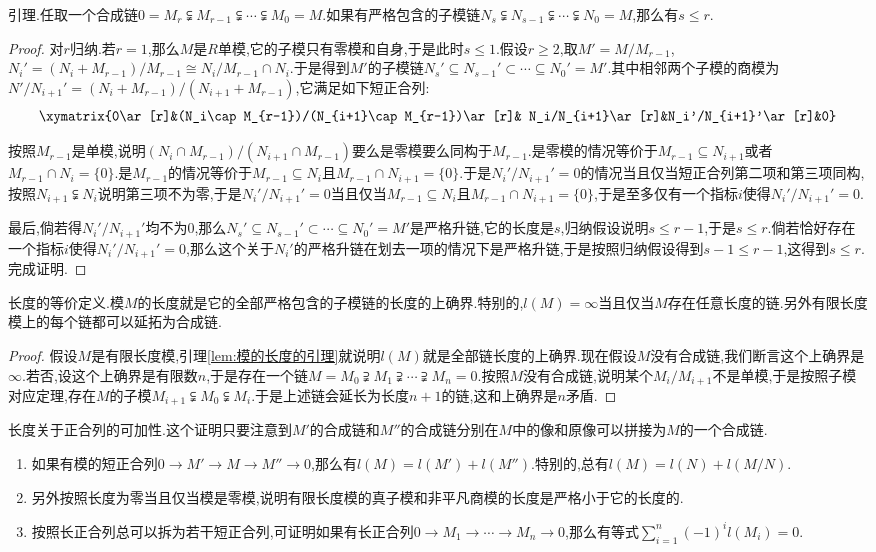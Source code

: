 引理.任取一个合成链$0=M_r\subsetneqq M_{r-1}\subsetneqq\cdots\subsetneqq M_0=M$.如果有严格包含的子模链$N_s\subsetneqq N_{s-1}\subsetneqq\cdots\subsetneqq N_0=M$,那么有$s\le r$.
\begin{proof}
	
	对$r$归纳.若$r=1$,那么$M$是$R$单模,它的子模只有零模和自身,于是此时$s\le1$.假设$r\ge2$,取$M'=M/M_{r-1}$,$N_i'=(N_i+M_{r-1})/M_{r-1}\cong N_i/M_{r-1}\cap N_i$.于是得到$M'$的子模链$N_s'\subseteq N_{s-1}'\subset\cdots\subseteq N_0'=M'$.其中相邻两个子模的商模为$N'/N_{i+1}'=(N_i+M_{r-1})/(N_{i+1}+M_{r-1})$,它满足如下短正合列:
	$$\xymatrix{0\ar[r]&(N_i\cap M_{r-1})/(N_{i+1}\cap M_{r-1})\ar[r]& N_i/N_{i+1}\ar[r]&N_i'/N_{i+1}'\ar[r]&0}$$
	
	按照$M_{r-1}$是单模,说明$(N_i\cap M_{r-1})/(N_{i+1}\cap M_{r-1})$要么是零模要么同构于$M_{r-1}$.是零模的情况等价于$M_{r-1}\subseteq N_{i+1}$或者$M_{r-1}\cap N_i=\{0\}$.是$M_{r-1}$的情况等价于$M_{r-1}\subseteq N_i$且$M_{r-1}\cap N_{i+1}=\{0\}$.于是$N_i'/N_{i+1}'=0$的情况当且仅当短正合列第二项和第三项同构,按照$N_{i+1}\subsetneqq N_i$说明第三项不为零,于是$N_i'/N_{i+1}'=0$当且仅当$M_{r-1}\subseteq N_i$且$M_{r-1}\cap N_{i+1}=\{0\}$,于是至多仅有一个指标$i$使得$N_i'/N_{i+1}'=0$.
	
	最后,倘若得$N_i'/N_{i+1}'$均不为0,那么$N_s'\subseteq N_{s-1}'\subset\cdots\subseteq N_0'=M'$是严格升链,它的长度是$s$,归纳假设说明$s\le r-1$,于是$s\le r$.倘若恰好存在一个指标$i$使得$N_i'/N_{i+1}'=0$,那么这个关于$N_i'$的严格升链在划去一项的情况下是严格升链,于是按照归纳假设得到$s-1\le r-1$,这得到$s\le r$.完成证明.
\end{proof}

长度的等价定义.模$M$的长度就是它的全部严格包含的子模链的长度的上确界.特别的,$l(M)=\infty$当且仅当$M$存在任意长度的链.另外有限长度模上的每个链都可以延拓为合成链.
\begin{proof}
	
	假设$M$是有限长度模,引理\ref{lem:模的长度的引理}就说明$l(M)$就是全部链长度的上确界.现在假设$M$没有合成链,我们断言这个上确界是$\infty$.若否,设这个上确界是有限数$n$,于是存在一个链$M=M_0\supsetneqq M_1\supsetneqq\cdots\supsetneqq M_n=0$.按照$M$没有合成链,说明某个$M_i/M_{i+1}$不是单模,于是按照子模对应定理,存在$M$的子模$M_{i+1}\subsetneqq M_0\subsetneqq M_i$.于是上述链会延长为长度$n+1$的链,这和上确界是$n$矛盾.
\end{proof}

长度关于正合列的可加性.这个证明只要注意到$M'$的合成链和$M''$的合成链分别在$M$中的像和原像可以拼接为$M$的一个合成链.
\begin{enumerate}
	\item 如果有模的短正合列$0\to M'\to M\to M''\to0$,那么有$l(M)=l(M')+l(M'')$.特别的,总有$l(M)=l(N)+l(M/N)$.
	\item 另外按照长度为零当且仅当模是零模,说明有限长度模的真子模和非平凡商模的长度是严格小于它的长度的.
	\item 按照长正合列总可以拆为若干短正合列,可证明如果有长正合列$0\to M_1\to\cdots\to M_n\to0$,那么有等式$\sum_{i=1}^n(-1)^il(M_i)=0$.
\end{enumerate}

